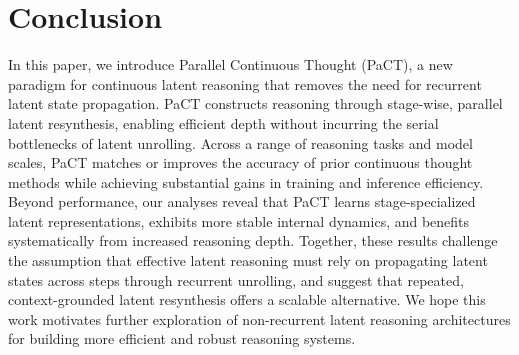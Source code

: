 \documentclass{article}
\theoremstyle{plain}
\theoremstyle{definition}
\theoremstyle{remark}
\begin{document}
\section{Conclusion}
\label{sec:conclusion}

In this paper, we introduce Parallel Continuous Thought (PaCT), a new paradigm for continuous latent reasoning that removes the need for recurrent latent state propagation. PaCT constructs reasoning through stage-wise, parallel latent resynthesis, enabling efficient depth without incurring the serial bottlenecks of latent unrolling. Across a range of reasoning tasks and model scales, PaCT matches or improves the accuracy of prior continuous thought methods while achieving substantial gains in training and inference efficiency. Beyond performance, our analyses reveal that PaCT learns stage-specialized latent representations, exhibits more stable internal dynamics, and benefits systematically from increased reasoning depth. Together, these results challenge the assumption that effective latent reasoning must rely on propagating latent states across steps through recurrent unrolling, and suggest that repeated, context-grounded latent resynthesis offers a scalable alternative.  We hope this work motivates further exploration of non-recurrent latent reasoning architectures for building more efficient and robust reasoning systems.






\end{document}
